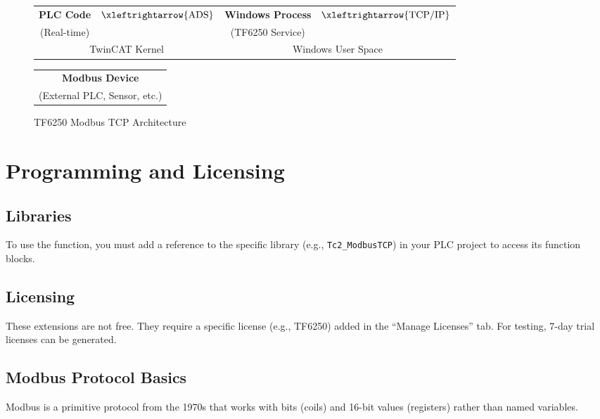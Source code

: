 \documentclass[11pt,a4paper]{article}
\begin{document}
\begin{figure}[h]
\centering
\begin{tabular}{|c|c|c|c|}
\hline
\textbf{PLC Code} & $\xleftrightarrow{\text{ADS}}$ & \textbf{Windows Process} & $\xleftrightarrow{\text{TCP/IP}}$ \\
(Real-time) & & (TF6250 Service) & \\
\hline
\multicolumn{2}{|c|}{TwinCAT Kernel} & \multicolumn{2}{c|}{Windows User Space} \\
\hline
\end{tabular}

\vspace{0.3cm}

\begin{tabular}{|c|}
\hline
\textbf{Modbus Device} \\
(External PLC, Sensor, etc.) \\
\hline
\end{tabular}
\caption{TF6250 Modbus TCP Architecture}
\end{figure}

\section{Programming and Licensing}

\subsection{Libraries}
To use the function, you must add a reference to the specific library (e.g., \texttt{Tc2\_ModbusTCP}) in your PLC project to access its function blocks.

\subsection{Licensing}
These extensions are not free. They require a specific license (e.g., TF6250) added in the ``Manage Licenses'' tab. For testing, 7-day trial licenses can be generated.

\subsection{Modbus Protocol Basics}
Modbus is a primitive protocol from the 1970s that works with bits (coils) and 16-bit values (registers) rather than named variables.
\end{document}
